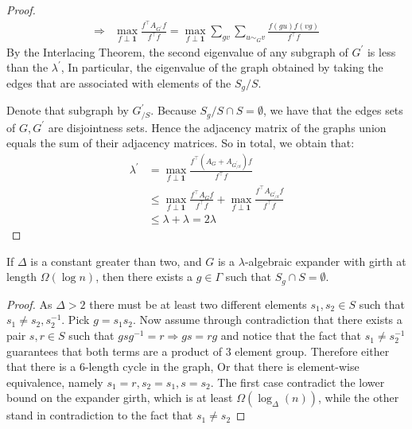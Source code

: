 \begin{proof}
\begin{equation*}
\begin{split}
      \Rightarrow  &  \max_{f \perp \mathbf{1}} { \frac{f^{\top}A_{G^{\prime}} f  }{ f^{\top}f}} =\max_{f \perp \mathbf{1}} { \sum_{gv}\sum_{ u\sim_{G} v }\frac{f\left( gu \right) f \left( vg \right)  }{ f^{\top}f}} 
    \end{split}
  \end{equation*}
  By the Interlacing Theorem, \cite{HAEMERS1995593} the second eigenvalue of any subgraph of $G^{\prime}$ is less than the $\lambda^{\prime}$, In particular, the eigenvalue of the graph obtained by taking the edges that are associated with elements of the $ S_{g} / S $. 

  Denote that subgraph by $G^{\prime}_{ / S}$. Because $S_{g} / S \cap S = \emptyset $, we have that the edges sets of $G, G^{\prime}$ are disjointness sets. Hence the adjacency matrix of the graphs union equals the sum of their adjacency matrices. So in total, we obtain that:  
  \begin{equation*}
    \begin{split}
      \lambda^{\prime} &= \max_{f \perp \mathbf{1}} { \frac{f^{\top} \left( A_{G} + A_{G^{\prime}_{/S}} \right) f  }{ f^{\top}f}} \\
      & \le  \max_{f \perp \mathbf{1}} { \frac{f^{\top}A_{G} f  }{ f^{\top}f}} +  \max_{f \perp \mathbf{1}} { \frac{f^{\top}A_{G^{\prime}_{/S}} f  }{ f^{\top}f}} \\
      & \le \lambda + \lambda = 2\lambda
    \end{split}
  \end{equation*} 
\end{proof} 
\begin{claim} \label{claim:using-ram}  If $\Delta$ is a constant greater than two, and $G$ is a $\lambda$-algebraic expander with girth at length $\Omega\left( \log n \right)$, then there exists a $g \in \Gamma$ such that $S_{g}\cap S = \emptyset$.  
\end{claim}
\begin{proof} As $\Delta > 2 $ there must be at least two different elements $s_{1},s_{2} \in S$  such that $s_{1} \neq s_{2}, s_{2}^{-1}$. Pick $g = s_{1}s_{2}$. Now assume through contradiction that there exists a pair $s,r \in S$ such that $gsg^{-1} = r \Rightarrow gs = rg$ and notice that the fact that $s_{1}\neq s_{2}^{-1}$ guarantees that both terms are a product of $3$ element group.
Therefore either that there is a $6$-length cycle in the graph, Or that there is element-wise equivalence, namely $s_{1} = r, s_{2} = s_{1}, s=s_{2}$. The first case contradict the lower bound on the expander girth, which is at least $\Omega \left( \log_{\Delta}(n) \right)$, while the other stand in contradiction to the fact that $s_{1} \neq s_{2}$ \end{proof}  

